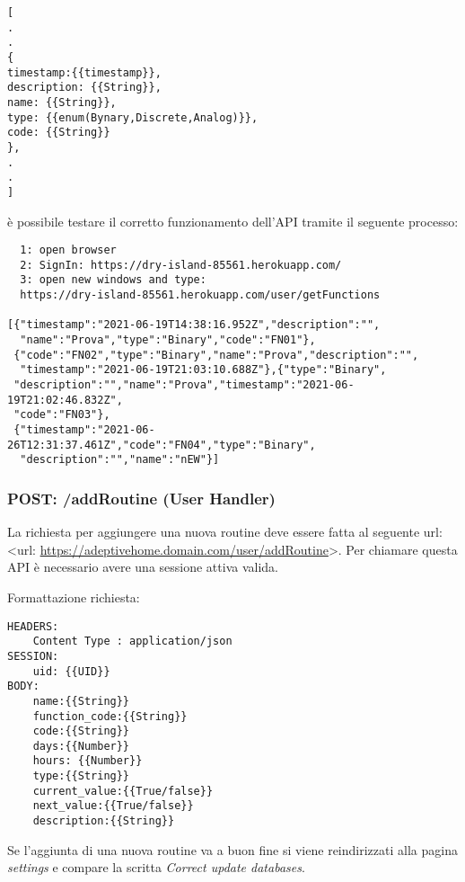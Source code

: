 \documentclass[onecolumn,a4paper]{article}
\begin{document}
\begin{verbatim}
[
.
.
{
timestamp:{{timestamp}},
description: {{String}},
name: {{String}},
type: {{enum(Bynary,Discrete,Analog)}},
code: {{String}}
},
.
.
]
\end{verbatim}

è possibile testare il corretto funzionamento dell'API tramite il seguente processo:

\begin{verbatim}
  1: open browser
  2: SignIn: https://dry-island-85561.herokuapp.com/
  3: open new windows and type:
  https://dry-island-85561.herokuapp.com/user/getFunctions

[{"timestamp":"2021-06-19T14:38:16.952Z","description":"",
  "name":"Prova","type":"Binary","code":"FN01"},
 {"code":"FN02","type":"Binary","name":"Prova","description":"",
  "timestamp":"2021-06-19T21:03:10.688Z"},{"type":"Binary",
 "description":"","name":"Prova","timestamp":"2021-06-19T21:02:46.832Z",
 "code":"FN03"},
 {"timestamp":"2021-06-26T12:31:37.461Z","code":"FN04","type":"Binary",
  "description":"","name":"nEW"}]

\end{verbatim}

\subsubsection{POST: /addRoutine (User Handler)}
\label{sec:orgfc30d5d}
La richiesta per aggiungere una nuova routine deve essere fatta al seguente url: <url: \url{https://adeptivehome.domain.com/user/addRoutine}>. Per chiamare questa API è necessario avere una sessione attiva valida. 

Formattazione richiesta:

\begin{verbatim}
HEADERS:
    Content Type : application/json
SESSION:
    uid: {{UID}}
BODY:
    name:{{String}}
    function_code:{{String}}
    code:{{String}}
    days:{{Number}}
    hours: {{Number}}
    type:{{String}}
    current_value:{{True/false}}
    next_value:{{True/false}}
    description:{{String}}

\end{verbatim}

Se l'aggiunta di una nuova routine va a buon fine si viene reindirizzati alla pagina \emph{settings} e compare la scritta \emph{Correct update databases}.
\end{document}
